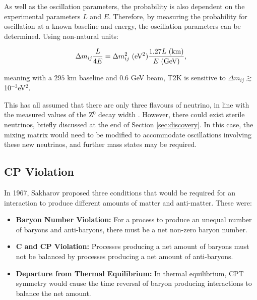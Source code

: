 As well as the oscillation parameters, the probability is also dependent on the experimental parameters $L$ and $E$. Therefore, by measuring the probability for oscillation at a known baseline and energy, the oscillation parameters can be determined. Using non-natural units:

\begin{equation}
\Delta m_{ij} \frac{L}{4E} = \Delta m_{ij}^2 \text{ (eV$^2$)} \frac{1.27 L \text{ (km)}}{E\text{ (GeV)}},
\vspace{10pt}
\end{equation}

meaning with a $295$ km baseline and $0.6$ GeV beam, T2K is sensitive to $\Delta m_{ij} \gtrsim$ 10$^{-3}$eV$^2$.

This has all assumed that there are only three flavours of neutrino, in line with the measured values of the Z$^0$ decay width \cite{lepslac,universalN}. However, there could exist sterile neutrinos, briefly discussed at the end of Section \ref{sec:discovery}. In this case, the mixing matrix would need to be modified to accommodate oscillations involving these new neutrinos, and further mass states may be required. 

\subsection{CP Violation}
\label{cpv}

In 1967, Sakharov proposed three conditions that would be required for an interaction to produce different amounts of matter and anti-matter\cite{sakharov}. These were:

\begin{itemize} 

\item \textbf{Baryon Number Violation:} For a process to produce an unequal number of baryons and anti-baryons, there must be a net non-zero baryon number.

\item \textbf{C and CP Violation:} Processes producing a net amount of baryons must not be balanced by processes producing a net amount of anti-baryons.

\item \textbf{Departure from Thermal Equilibrium:} In thermal equilibrium, CPT symmetry would cause the time reversal of baryon producing interactions to balance the net amount.

\end{itemize}

